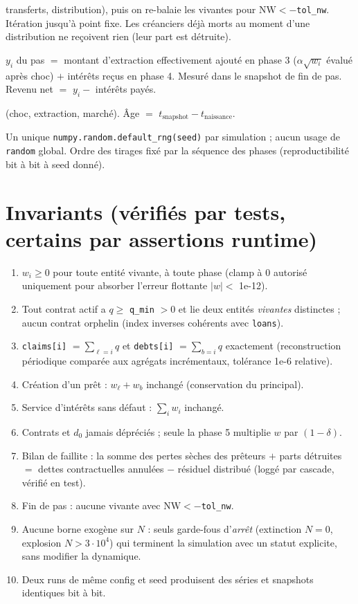 \documentclass[11pt,a4paper]{article}
\newcommand{\NW}{\mathrm{NW}}
\newcommand{\code}[1]{\texttt{#1}}
\begin{document}
\begin{description}[style=nextline]
  transferts, distribution), puis on re-balaie les vivantes pour
  $\NW < -$\code{tol\_nw}. Itération jusqu'à point fixe. Les créanciers déjà
  morts au moment d'une distribution ne reçoivent rien (leur part est
  détruite).
\item[C8 — Revenu.] $y_i$ du pas $=$ montant d'extraction effectivement
  ajouté en phase 3 ($\alpha\sqrt{w_i}$ évalué après choc) $+$ intérêts
  reçus en phase 4. Mesuré dans le snapshot de fin de pas. Revenu net $=$
  $y_i -$ intérêts payés.
\item[C9 — Les nouveau-nés du pas participent à tout le pas] (choc,
  extraction, marché). Âge $=$ $t_{\mathrm{snapshot}} - t_{\mathrm{naissance}}$.
\item[C10 — RNG.] Un unique \code{numpy.random.default\_rng(seed)} par
  simulation ; aucun usage de \code{random} global. Ordre des tirages fixé
  par la séquence des phases (reproductibilité bit à bit à seed donné).
\end{description}

\section{Invariants (vérifiés par tests, certains par assertions runtime)}

\begin{enumerate}[nosep]
\item[I1.] $w_i \ge 0$ pour toute entité vivante, à toute phase (clamp à 0
  autorisé uniquement pour absorber l'erreur flottante $|w| <$ 1e-12).
\item[I2.] Tout contrat actif a $q \ge$ \code{q\_min} $> 0$ et lie deux
  entités \emph{vivantes} distinctes ; aucun contrat orphelin (index
  inverses cohérents avec \code{loans}).
\item[I3.] \code{claims[i]} $= \sum_{\ell=i} q$ et \code{debts[i]}
  $= \sum_{b=i} q$ exactement (reconstruction périodique comparée aux
  agrégats incrémentaux, tolérance 1e-6 relative).
\item[I4.] Création d'un prêt : $w_\ell + w_b$ inchangé (conservation du
  principal).
\item[I5.] Service d'intérêts sans défaut : $\sum_i w_i$ inchangé.
\item[I6.] Contrats et $d_0$ jamais dépréciés ; seule la phase 5 multiplie
  $w$ par $(1-\delta)$.
\item[I7.] Bilan de faillite : la somme des pertes sèches des prêteurs
  $+$ parts détruites $=$ dettes contractuelles annulées $-$ résiduel
  distribué (loggé par cascade, vérifié en test).
\item[I8.] Fin de pas : aucune vivante avec $\NW < -$\code{tol\_nw}.
\item[I9.] Aucune borne exogène sur $N$ : seuls garde-fous d'\emph{arrêt}
  (extinction $N=0$, explosion $N > 3\cdot 10^4$) qui terminent la
  simulation avec un statut explicite, sans modifier la dynamique.
\item[I10.] Deux runs de même config et seed produisent des séries et
  snapshots identiques bit à bit.
\end{enumerate}
\end{document}
